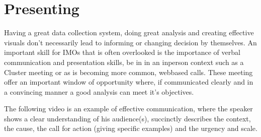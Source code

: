 \documentclass[letterpaper,10pt,english]{jupyterBook}
\begin{document}
\section{Presenting}
\label{\detokenize{part1/communication:presenting}}
\sphinxAtStartPar
Having a great data collection system, doing great analysis and creating effective visuals don’t necessarily lead to informing or changing decision by themselves. An important skill for IMOs that is often overlooked is the importance of verbal communication and presentation skills, be in in an in\sphinxhyphen{}person context such as a Cluster meeting or as is becoming more common, web\sphinxhyphen{}based calls. These meeting offer an important window of opportunity where, if communicated clearly and in a convincing manner a good analysis can meet it’s objectives.

\sphinxAtStartPar
The following video is an example of effective communication, where the speaker shows a clear understanding of his audience(s), succinctly describes the context, the cause, the call for action (giving specific examples) and the urgency and scale.
\end{document}
